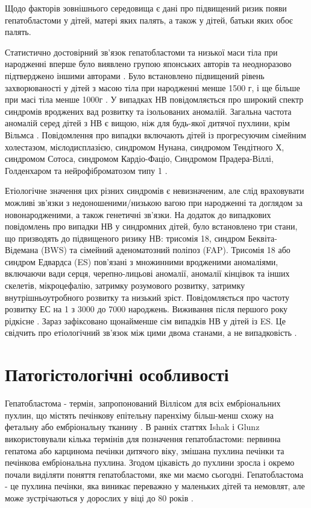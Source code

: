 Щодо факторів зовнішнього середовища є дані про підвищений ризик появи гепатобластоми у дітей, матері яких палять, а також у дітей, батьки яких обоє палять. 

Статистично достовірний зв'язок гепатобластоми та низької маси тіла при народженні вперше було виявлено групою японських авторів \cite{pmid14752798} та неодноразово підтверджено іншими авторами \cite{pmid14746860}. Було встановлено підвищений рівень захворюваності у дітей з масою тіла при народженні менше 1500 г, і ще більше при масі тіла менше 1000г \cite{pmid15285242}.
У випадках НВ повідомляється про широкий спектр синдромів вроджених вад розвитку та ізольованих аномалій. Загальна частота аномалій серед дітей з НВ є вищою, ніж для будь-якої дитячої пухлини, 
крім Вільмса \cite{pmid15285242}. Повідомлення про випадки включають дітей із прогресуючим сімейним холестазом, мієлодисплазією, синдромом Нунана, синдромом Тендітного Х, синдромом Сотоса, синдромом Кардіо-Фаціо, Синдромом Прадера-Віллі, Голденхаром та нейрофіброматозом типу 1 \cite{pmid25649007}.

Етіологічне значення цих різних синдромів є невизначеним, але слід враховувати можливі зв’язки з недоношеними/низькою вагою при народженні та доглядом за новонародженими, а також генетичні зв’язки.
На додаток до випадкових повідомлень про випадки НВ у синдромних дітей, було встановлено три стани, що призводять до підвищеного ризику НВ: трисомія 18, синдром Беквіта-Відемана (BWS) та сімейний аденоматозний поліпоз (FAP). Трисомія 18 або синдром Едвардса (ES) пов'язані з множинними вродженими аномаліями, включаючи вади серця, черепно-лицьові аномалії, аномалії кінцівок та інших скелетів, мікроцефалію, затримку розумового розвитку, затримку внутрішньоутробного розвитку та низький зріст. 
Повідомляється про частоту розвитку ЕС на 1 з 3000 до 7000 народжень. Виживання після першого року рідкісне \cite{pmid14966740}. Зараз зафіксовано щонайменше сім випадків НВ у дітей із ES. Це свідчить про етіологічний зв’язок між цими двома станами, а не випадковість \cite{pmid14966739}. 

\section{Патогістологічні особливості}
Гепатобластома - термін, запропонований Віллісом для всіх ембріональних пухлин, що містять печінкову епітельну паренхіму більш-менш схожу на фетальну або ембріональну тканину \cite{pmid20070564}. В ранніх статтях Ishak і Glunz використовували кілька термінів для позначення гепатобластоми: первинна гепатома або карцинома печінки дитячого віку, змішана пухлина печінки та печінкова ембріональна пухлина. Згодом цікавість до пухлини зросла і окремо почали виділяти поняття гепатобластоми, яке ми маємо сьогодні. Гепатобластома - це пухлина печінки, яка виникає переважно у маленьких дітей та немовлят, але може зустрічаються у дорослих у віці до 80 років \cite{pmid11792985}.

